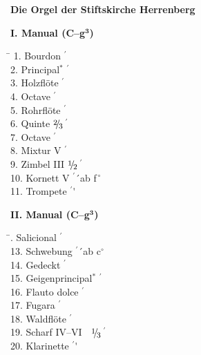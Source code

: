 \documentclass[a4paper,12pt,halfparskip]{scrartcl}
\newcommand{\p}{\phantom{1}}
\newcommand{\Fuss}{$^\prime$}
\newcommand{\bruch}[2]{$\raisebox{2pt}{\footnotesize#1}\hspace{-2pt}/\hspace{-1.5pt}\raisebox{-2pt}{\footnotesize#2}$}
\newcommand{\eh}{\bruch{1}{2}$\,$}
\newcommand{\ed}{\bruch{1}{3}$\,$}
\newcommand{\zd}{\bruch{2}{3}$\,$}
\begin{document}
{\LARGE\bfseries Die Orgel der Stiftskirche Herrenberg}

\vfill

\begin{minipage}[t]{.55\textwidth}
{\bfseries I. Manual (C--g$^{\mathbf3}$)}
\begin{tabbing}
\hspace{5cm}\= \kill
\mbox{}\p1. Bourdon \Fuss\' \\
\p2. Principal$^*$ \Fuss\' \\
\p3. Holzflöte \Fuss\' \\
\p4. Octave \Fuss\' \\
\p5. Rohrflöte \Fuss\' \\
\p6. Quinte  \zd\Fuss\' \\
\p7. Octave \Fuss\' \\
\p8. Mixtur V \Fuss\' \\
\p9. Zimbel III \>\eh\Fuss\' \\
10. Kornett V \Fuss\'\ ab f$^{\,\circ}$ \\
11. Trompete \Fuss\'
\end{tabbing}

{\bfseries II. Manual (C--g$^{\mathbf3}$)}
\begin{tabbing}
\hspace{5cm}\= . Salicional \Fuss\' \\
13. Schwebung \Fuss\'\ ab c$^\circ$ \\
14. Gedeckt \Fuss\' \\
15. Geigenprincipal$^*$ \Fuss\' \\
16. Flauto dolce \Fuss\' \\
17. Fugara \Fuss\' \\
18. Waldflöte \Fuss\' \\
19. Scharf IV--VI $\;$  \ed\Fuss\' \\
20. Klarinette \Fuss\'
\end{tabbing}
\end{minipage}
\end{document}
